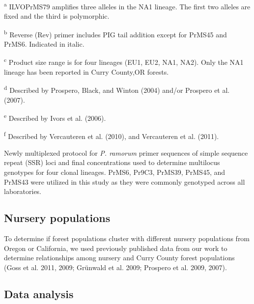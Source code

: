 \documentclass[double,12pt]{beavtex}
\begin{document}
\begin{table}
  \begin{scriptsize}
  \raggedright{\textsuperscript{a} ILVOPrMS79 amplifies three alleles in the NA1
  lineage. The first two alleles are fixed and the third is
  polymorphic.}\\
  \raggedright{\textsuperscript{b} Reverse (Rev) primer includes PIG tail addition
  except for PrMS45 and PrMS6. Indicated in italic.}\\
  \raggedright{\textsuperscript{c} Product size range is for four lineages (EU1, EU2,
  NA1, NA2). Only the NA1 lineage has been reported in Curry County,OR
  forests.}\\
  \raggedright{\textsuperscript{d} Described by Prospero, Black, and Winton (2004)
  and/or Prospero et al. (2007).}\\
  \raggedright{\textsuperscript{e} Described by Ivors et al. (2006).}\\
  \raggedright{\textsuperscript{f} Described by Vercauteren et al. (2010), and
  Vercauteren et al. (2011).}\\
  \end{scriptsize}
  
  \caption[Newly multiplexed protocol for \emph{P. ramorum}
  primer sequences of simple sequence repeat (SSR) loci and final
  concentrations used to determine multilocus genotypes for four clonal
  lineages.]{Newly multiplexed protocol for \emph{P. ramorum}
  primer sequences of simple sequence repeat (SSR) loci and final
  concentrations used to determine multilocus genotypes for four clonal
  lineages. PrMS6, Pr9C3, PrMS39, PrMS45, and PrMS43 were utilized in this
  study as they were commonly genotyped across all laboratories.}
  \label{tab:ramorum2}
  \end{table}
  
  \subsection{Nursery populations}\label{nursery-populations}
  
  To determine if forest populations cluster with different nursery
  populations from Oregon or California, we used previously published data
  from our work to determine relationships among nursery and Curry County
  forest populations (Goss et al. 2011, 2009; Grünwald et al. 2009;
  Prospero et al. 2009, 2007).
  
  \subsection{Data analysis}\label{data-analysis}
  
\end{document}
